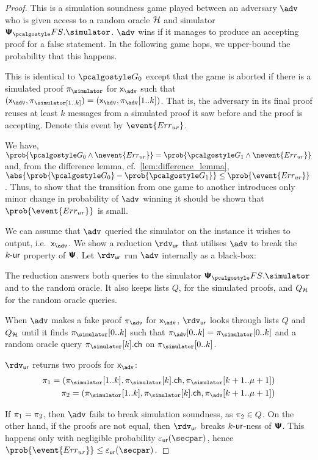 \documentclass[runningheads,11pt]{llncs}
\begin{document}
\begin{proof}
   This is a simulation soundness game played between an adversary
  $\adv$ who is given access to a random oracle $\mathcal{H}$ and simulator
  $\psfs.\simulator$. $\adv$ wins if it manages to produce an accepting proof
  for a false statement. In the following game hops, we upper-bound the
  probability that this happens.

   This is identical to $\game{0}$ except that the game is aborted if
  there is a simulated proof $\zkproof_\simulator$ for $\inp_{\adv}$ such that
  $(\inp_{\adv}, \zkproof_\simulator[1..k]) = (\inp_{\adv},
  \zkproof_{\adv}[1..k])$. That is, the adversary in its final proof reuses at
  least $k$ messages from a simulated proof it saw before and the proof is
  accepting.  Denote this event by $\event{\errur}$.

   We have, \( \prob{\game{0} \land
    \nevent{\errur}} = \prob{\game{1} \land \nevent{\errur}} \) and, from the
  difference lemma, cf.~\cref{lem:difference_lemma},
  $ \abs{\prob{\game{0}} - \prob{\game{1}}} \leq \prob{\event{\errur}}\,$.
  Thus, to show that the transition from one game to another introduces only
  minor change in probability of $\adv$ winning it should be shown that
  $\prob{\event{\errur}}$ is small.

  We can assume that $\adv$ queried the simulator on the instance it wishes to
  output, i.e.~$\inp_{\adv}$. We show a reduction $\rdvur$ that utilises $\adv$
  to break the ${k\text{-}\mathsf{ur}}$ property of $\bm{\mathsf{\Psi}}$. Let $\rdvur$ run $\advse$ internally
  as a black-box:
  \begin{compactitem}
	\item The reduction answers both queries to the simulator $\psfs.\simulator$
    and to the random oracle.  It also keeps lists $Q$, for the simulated
    proofs, and $Q_{\mathcal{H}}$ for the random oracle queries.
  \item When $\adv$ makes a fake proof $\zkproof_{\adv}$ for $\inp_{\adv}$,
    $\rdvur$ looks through lists $Q$ and $Q_{\mathcal{H}}$ until it finds
    $\zkproof_{\simulator}[0..k]$ such that
    $\zkproof_{\adv}[0..k] = \zkproof_{\simulator}[0..k]$ and a random oracle
    query $\zkproof_{\simulator}[k].\ch$ on $\zkproof_{\simulator}[0..k]$.
	\item $\rdvur$ returns two proofs for $\inp_{\adv}$:
	\begin{align*}
		\zkproof_1 = (\zkproof_{\simulator}[1..k],
		\zkproof_{\simulator}[k].\ch, \zkproof_{\simulator}[k + 1..\mu + 1])\\
		\zkproof_2 = (\zkproof_{\simulator}[1..k],
		\zkproof_{\simulator}[k].\ch, \zkproof_{\adv}[k + 1..\mu + 1])
	\end{align*}
	\end{compactitem}  
	If $\pi_1 = \pi_2$, then $\adv$ fails to break simulation soundness,
  as $\pi_2 \in Q$. On the other hand, if the proofs are not equal, then
  $\rdvur$ breaks ${k\text{-}\mathsf{ur}}$-ness of $\bm{\mathsf{\Psi}}$. This happens only with negligible
  probability $\epsur(\secpar)$, hence
  \( \prob{\event{\errur}} \leq \epsur(\secpar)\,. \)
	

\end{proof}
\end{document}
